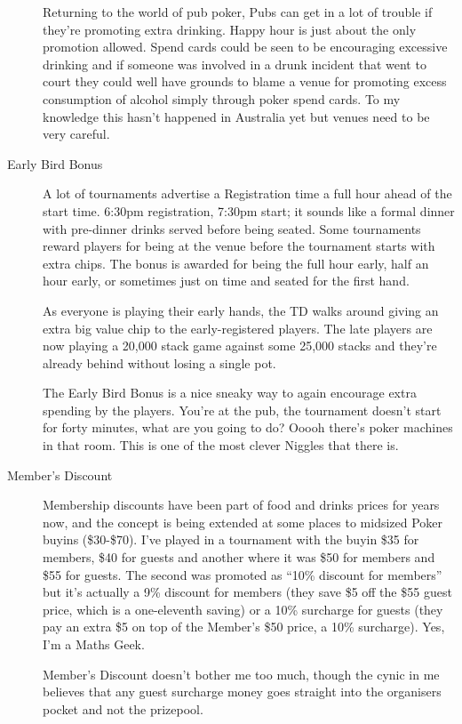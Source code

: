 \begin{description}
Returning to the world of pub poker, Pubs can get in a lot of trouble
if they're promoting extra drinking. Happy hour is just about the only
promotion allowed. Spend cards could be seen to be encouraging
excessive drinking and if someone was involved in a drunk incident
that went to court they could well have grounds to blame a venue for
promoting excess consumption of alcohol simply through poker
spend cards. To my knowledge this hasn't happened in Australia yet
but venues need to be very careful.

\item[Early Bird Bonus] A lot of tournaments advertise a Registration
time a full hour ahead of the start time. 6:30pm registration, 7:30pm
start; it sounds like a formal dinner with pre-dinner drinks served
before being seated. Some tournaments reward players for being
at the venue before the tournament starts with extra
chips. The bonus is awarded for being the full hour early, half an
hour early, or sometimes just on time and seated for the first hand.

As everyone is playing their early hands, the TD walks around
giving an extra big value chip to the early-registered players. The
late players are now playing a 20,000 stack game against some
25,000 stacks and they're already behind without losing a single pot.

The Early Bird Bonus is a nice sneaky way to again encourage extra
spending by the players. You're at the pub, the tournament doesn't
start for forty minutes, what are you going to do? Ooooh there's poker
machines in that room. This is one of the most clever Niggles that
there is.

\item[Member's Discount] Membership discounts have been part
of food and drinks prices for years now, and the concept
is being extended at some places to midsized Poker buyins
(\$30-\$70). I've played in a tournament with the buyin
\$35 for members, \$40 for guests and another where it was \$50
for members and \$55 for guests. The second was promoted as ``10\%
discount for members'' but it's actually a 9\% discount for members
(they save \$5 off the \$55 guest price, which is a one-eleventh saving)
or a 10\% surcharge for guests (they pay an extra \$5 on top of the
Member's \$50 price, a 10\% surcharge). Yes, I'm a Maths Geek.

Member's Discount doesn't bother me too much, though the
cynic in me believes that any guest surcharge money
goes straight into the organisers pocket and not the prizepool.


\end{description}
